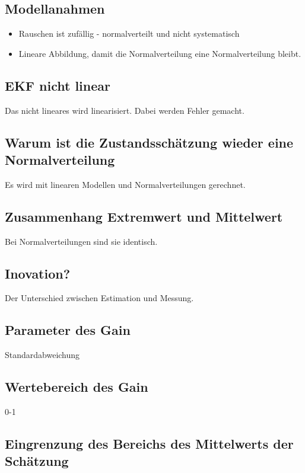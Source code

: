 \subsection{Modellanahmen}

\begin{itemize}
	\item Rauschen ist zufällig - normalverteilt und nicht systematisch
	\item Lineare Abbildung, damit die Normalverteilung eine Normalverteilung bleibt.
\end{itemize}

\subsection{EKF nicht linear}
 Das nicht lineares wird linearisiert. Dabei werden Fehler gemacht.

\subsection{Warum ist die Zustandsschätzung wieder eine Normalverteilung}
Es wird mit linearen Modellen und Normalverteilungen gerechnet.

\subsection{Zusammenhang Extremwert und Mittelwert}
Bei Normalverteilungen sind sie identisch.

\subsection{Inovation?}
Der Unterschied zwischen Estimation und Messung.

\subsection{Parameter des Gain}
Standardabweichung

\subsection{Wertebereich des Gain}
0-1

\subsection{Eingrenzung des Bereichs des Mittelwerts der Schätzung}


